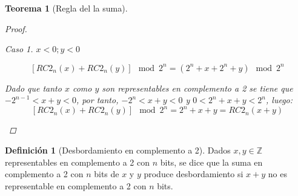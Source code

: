 \documentclass[spanish,a4paper,12pt,titlepage]{article}
\newtheorem{theorem}{Teorema}%
\theoremstyle{definition}
\newtheorem{definition}{Definición}%
\theoremstyle{remark}
\newtheorem{case}{Caso}
\newcommand{\bbZ}{\mathbb{Z}}
\begin{document}
\begin{theorem}[Regla del la suma]
\begin{proof}
        \begin{case}
            $x < 0; y < 0$

            \[
                [RC2_n(x)+RC2_n(y)] \mod 2^n = (2^n + x + 2^n + y) \mod 2^n
            \]

            Dado que tanto $x$ como $y$ son representables en complemento a 2
            se tiene que $-2^{n-1} < x+y < 0$, por tanto, $-2^n < x+y < 0$
            y $0 < 2^n + x + y < 2^n$, luego:
            \[
                [RC2_n(x)+RC2_n(y)] \mod 2^n = 2^n + x + y = RC2_n(x + y)
            \]
        \end{case}
    \end{proof}
\end{theorem}

\begin{definition}[Desbordamiento en complemento a 2]
    Dados $x, y \in \bbZ$ representables en complemento a 2 con $n$ bits, se dice que la suma en complemento a 2 con $n$ bits de $x$ y $y$ produce desbordamiento si $x+y$ no es representable en complemento a 2 con $n$ bits.
\end{definition}
\end{document}
